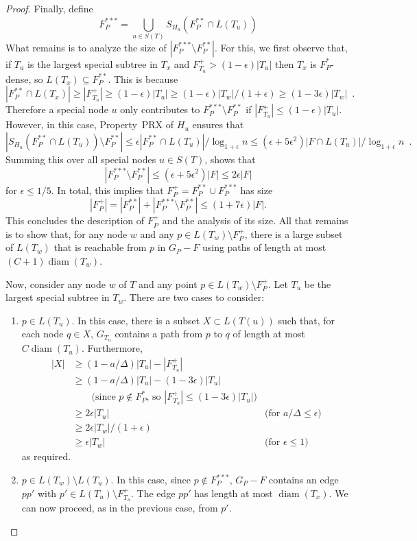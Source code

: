 \documentclass{patmorin}
\DeclareMathOperator{\diam}{diam}
\begin{document}
\begin{proof}
  Finally, define 
  \[  F^{***}_P = \bigcup_{u\in S(T)} S_{H_u}(F^{**}_P\cap L(T_{u}))  \]
  What remains is to analyze the size of $|F^{***}_P\setminus F^{**}_P|$.
  For this, we first observe that, if $T_u$ is the largest special
  subtree in $T_x$ and $F^+_{T_u} > (1-\epsilon)|T_u|$ then
  $T_x$ is $F^*_P$-dense, so $L(T_x)\subseteq F^{**}_P$.  
  This is because
  \[
     |F^{**}_P\cap L(T_x)| 
  \ge  
     |F^+_{T_u}|
  \ge  
     (1-\epsilon)|T_u|
  \ge  
     (1-\epsilon)|T_w|/(1+\epsilon)
  \ge  
     (1-3\epsilon)|T_w| \enspace .
  \]
  Therefore a special node $u$ only contributes to $F^{***}_P\setminus
  F^{**}_P$ if $|F^+_{T_u}| \le (1-\epsilon)|T_u|$.  However,
  in this case, Property~PRX of $H_u$ ensures that 
  \[ |S_{H_u}(F^{**}_P\cap L(T_u))\setminus F^{**}_P| \le \epsilon|F^{**}_P\cap L(T_u)|/\log_{1+\epsilon} n \le
  (\epsilon+5\epsilon^2)|F\cap L(T_u)|/\log_{1+\epsilon} n\enspace . \]
  Summing this over all special nodes $u\in S(T)$,
  shows that
  \[
     |F^{***}_P\setminus F^{**}_P| \le (\epsilon+5\epsilon^2)|F| \le 2\epsilon|F|
  \]
  for $\epsilon \le 1/5$.
  In total, this implies that $F^+_P = F^{**}_P\cup F^{***}_P$ has size
  \[ |F^+_P| = |F^{**}_P| + |F^{***}_P\setminus F^{**}_P|\le (1+7\epsilon)|F| .
  \]  
  This concludes the description of $F^+_P$ and the analysis of its
  size.  All that remains is to show that, for any node $w$ and any
  $p\in L(T_w)\setminus F^+_P$, there is a large subset of $L(T_w)$
  that is reachable from $p$ in $G_P-F$ using paths of length at most
  $(C+1)\diam(T_w)$.

  Now, consider any node $w$ of $T$ and any point $p\in L(T_w)\setminus
  F^+_P$.  Let $T_u$ be the largest special subtree in $T_w$.
  There are two cases to consider:
  \begin{enumerate}
    \item $p\in L(T_u)$. In this case, there is a subset $X\subset L(T(u))$
     such that, for each node $q\in X$, $G_{T_u}$ contains a path from
     $p$ to $q$ of length at most $C\diam(T_u)$. Furthermore,
    \begin{align*}
      |X| & \ge (1-a/\Delta)|T_u| - |F^+_{T_u}| \\
          & \ge (1-a/\Delta)|T_u| - (1-3\epsilon)|T_u| \\
             & \qquad \text{(since $p\not\in F^*_P$, so $|F^+_{T_u}|\le (1-3\epsilon)|T_u|$)} \\
         & \ge 2\epsilon|T_u| 
           & \text{(for $a/\Delta \le \epsilon$)} \\ 
         & \ge 2\epsilon|T_w|/(1+\epsilon)  \\
         & \ge \epsilon|T_w| 
           & \text{(for $\epsilon \le 1)$} 
    \end{align*}
    as required.

    \item $p\in L(T_w)\setminus L(T_u)$.  In this case, since $p\not\in
    F^{***}_P$, $G_P-F$ contains an edge $pp'$ with $p'\in L(T_u)\setminus
    F^{+}_{T_u}$.  The edge $pp'$ has length at most $\diam(T_x)$.
    We can now proceed, as in the previous case, from $p'$.
  \end{enumerate}
\end{proof}
\end{document}
